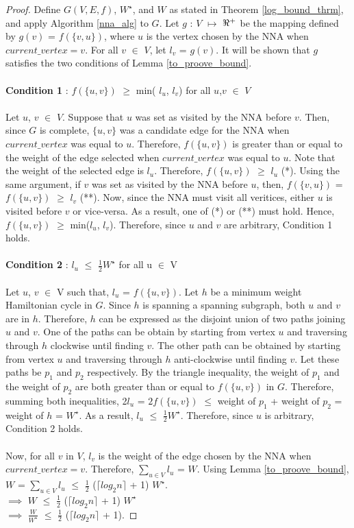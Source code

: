 \documentclass[12pt]{article}
\numberwithin{equation}{subsection}
\numberwithin{table}{subsection}
\numberwithin{algorithm}{subsection}
\begin{document}
\begin{proof}
Define $G(V,E,f)$, $W^\star$, and $W$ as stated in Theorem \ref{log_bound_thrm}, and apply Algorithm \ref{nna_alg} to $G$. Let $g$ : $V$ $\mapsto$ $\real^+$ be the mapping defined by $g(v)$ = $f(\{v,u\})$, where $u$ is the vertex chosen by the NNA when $current\_vertex = v$. For all $v$ $\in$ $V$, let $l_v$ = $g(v)$. It will be shown that $g$ satisfies the two conditions of Lemma \ref{to_proove_bound}.\\\\
\textbf{Condition 1} :  $f(\{u, v\})$ $\geq$ min( $l_u$, $l_v$) for all $u$,$v$ $\in$ $V$\\\\
Let $u$, $v$ $\in$ $V$. Suppose that $u$ was set as visited by the NNA before $v$. Then, since $G$ is complete, $\{u, v\}$ was a candidate edge for the NNA when $current\_vertex$ was equal to $u$. Therefore, $f(\{u, v\})$ is greater than or equal to the weight of the edge selected when $current\_vertex$ was equal to $u$. Note that the weight of the selected edge is $l_u$. Therefore, $f(\{u, v\})$ $\geq$ $l_u$ (*). Using the same argument, if $v$ was set as visited by the NNA before $u$, then, $f(\{v, u\})$ = $f(\{u, v\})$ $\geq$ $l_v$ (**). Now, since the NNA must visit all veritices, either $u$ is visited before $v$ or vice-versa. As a result, one of (*) or (**) must hold. Hence, $f(\{u, v\})$ $\geq$ min($l_u$, $l_v$). Therefore, since $u$ and $v$ are arbitrary, Condition 1 holds.\\\\
\textbf{Condition 2} :  $l_u$ $\leq$ $\frac{1}{2}W^\star$ for all u $\in$ V\\\\
Let  $u$, $v$ $\in$ V such that, $l_u$ = $f(\{u, v\})$. Let $h$ be a minimum weight Hamiltonian cycle in $G$. Since $h$ is spanning a spanning subgraph, both $u$ and $v$ are in $h$. Therefore, $h$ can be expressed as the disjoint union of two paths joining $u$ and $v$. One of the paths can be obtain by starting from vertex $u$ and traversing through $h$ clockwise until finding $v$. The other path can be obtained by starting from vertex $u$ and traversing through $h$ anti-clockwise until finding $v$. Let these paths be $p_1$ and $p_2$ respectively. By the triangle inequality, the weight of $p_1$ and the weight of $p_2$ are both greater than or equal to $f(\{u,v\})$ in $G$. Therefore, summing both inequalities, 2$l_u$ = $2f(\{u,v\})$ $\leq$ weight of $p_1$ + weight of $p_2$ = weight of $h$ = $W^\star$. As a result, $l_u$ $\leq$ $\frac{1}{2}W^\star$. Therefore, since $u$ is arbitrary, Condition 2 holds.\\\\Now, for all $v$ in $V$, $l_v$ is the weight of the edge chosen by the NNA when $current\_vertex = v$. Therefore, $\sum_{u \in V} l_u $ =  $W$. Using Lemma \ref{to_proove_bound}, $W$ = $\sum_{u \in V} l_u $ $\leq$ $\frac{1}{2}$ ($\lceil log_2 n \rceil$ + 1) $W^\star$.\\ $\implies$ $W$ $\leq$ $\frac{1}{2}$ ($\lceil log_2 n \rceil$ + 1) $W^\star$\\ $\implies$ $\frac{W}{W^\star}$ $\leq$ $\frac{1}{2}$ ($\lceil log_2 n \rceil$ + 1).
\end{proof}
\end{document}

